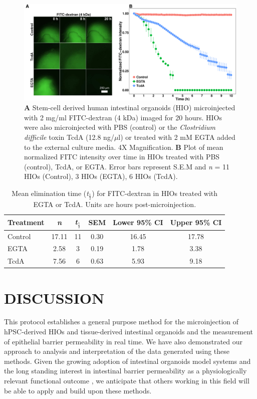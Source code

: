 \documentclass[11pt]{article}
\begin{document}
\begin{figure}
\includegraphics[width=0.95\linewidth]{./results/figure4.pdf}
\caption{\textbf{A} Stem-cell derived human intestinal organoids (HIO) microinjected with 2 mg/ml FITC-dextran (4 kDa) imaged for 20 hours. HIOs were also microinjected with PBS (control) or the \textit{Clostridium difficile} toxin TcdA (12.8 ng/$\mu$l) or treated with 2 mM EGTA added to the external culture media. 4X Magnification. \textbf{B} Plot of mean normalized FITC intensity over time in HIOs treated with PBS (control), TcdA, or EGTA. Error bars represent S.E.M and \textit{n} = 11 HIOs (Control), 3 HIOs (EGTA), 6 HIOs (TcdA).}
\end{figure}

\begin{table}[ht]
\centering
\begin{tabular}{l|ccccc}
{\bf Treatment} & {\bf \textit{n}} & {\bf \textit{t}$_\frac{1}{2}$} & {\bf SEM} & {\bf Lower 95\% CI} & {\bf Upper 95\% CI} \\ 
\hline
Control & 17.11 &  11 & 0.30 & 16.45 & 17.78 \\ 
EGTA & 2.58 &   3 & 0.19 & 1.78 & 3.38 \\ 
TcdA & 7.56 &   6 & 0.63 & 5.93 & 9.18 \\ 
\end{tabular}
\caption{Mean elimination time (\textit{t}$_\frac{1}{2}$) for FITC-dextran in HIOs treated with EGTA or TcdA. Units are hours post-microinjection.}
\end{table}


\section*{DISCUSSION}
This protocol establishes a general purpose method for the microinjection of hPSC-derived HIOs and tissue-derived intestinal organoids and the measurement of epithelial barrier permeability in real time. We have also demonstrated our approach to analysis and interpretation of the data generated using these methods. Given the growing adoption of intestinal organoids model systems \supercite{Clevers:2016,Hill:2017,Aurora:2016,Dedhia:2016} and the long standing interest in intestinal barrier permeability as a physiologically relevant functional outcome \supercite{Clayburgh:2004,Turner:2009,Bischoff:2014,Odenwald:2017}, we anticipate that others working in this field will be able to apply and build upon these methods.\\
\end{document}
